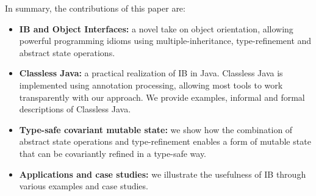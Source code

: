In summary, the contributions of this paper are:
\begin{itemize}

\item {\bf IB and Object Interfaces:} a novel take on object orientation, allowing
  powerful programming idioms using multiple-inheritance, 
  type-refinement and abstract state operations.

\item {\bf Classless Java:} a practical realization of IB in
  Java. Classless Java is implemented using annotation processing, 
  allowing most tools to work transparently with our approach. 
  We provide examples, informal and formal descriptions of Classless
  Java.

\item {\bf Type-safe covariant mutable state:} we show how the 
 combination of abstract state operations and type-refinement enables 
 a form of mutable state that can be covariantly refined in a type-safe way.


\item {\bf Applications and case studies:} we illustrate the usefulness of IB
  through various examples and case studies.


\end{itemize}
